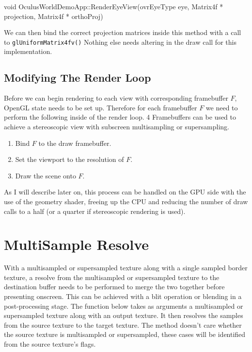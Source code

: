 \documentclass[12pt,a4paper,twoside,openright]{report}
\begin{document}
\begin{blockcode}[commandchars=\\\{\}]
void OculusWorldDemoApp::RenderEyeView(ovrEyeType eye,
                                       \color{green}Matrix4f * projection,
                                       \color{green}Matrix4f * orthoProj)
\end{blockcode}

We can then bind the correct projection matrices inside this method with a call to \texttt{glUniformMatrix4fv()}
Nothing else needs altering in the draw call for this implementation.

\subsection{Modifying The Render Loop}

Before we can begin rendering to each view with corresponding framebuffer $F$, OpenGL state needs to be set up. Therefore for each framebuffer $F$ we need to perform the following inside of the render loop. 4 Framebuffers can be used to achieve a stereoscopic view with subscreen multisampling or supersampling.

\begin{enumerate}

\item Bind $F$ to the draw framebuffer.
\item Set the viewport to the resolution of $F$.
\item Draw the scene onto $F$.

\end{enumerate}

As I will describe later on, this process can be handled on the GPU side with the use of the geometry shader, freeing up the CPU and reducing the number of draw calls to a half (or a quarter if stereoscopic rendering is used).

\section{MultiSample Resolve}

With a multisampled or supersampled texture along with a single sampled border texture, a resolve from the multisampled or supersampled texture to the destination buffer needs to be performed to merge the two together before presenting onscreen. This can be achieved with a blit operation or blending in a post-processing stage.
The function below takes as arguments a multisampled or supersampled texture along with an output texture. It then resolves the samples from the source texture to the target texture. The method doesn't care whether the source texture is multisampled or supersampled, these cases will be identified from the source texture's flags.
\end{document}
